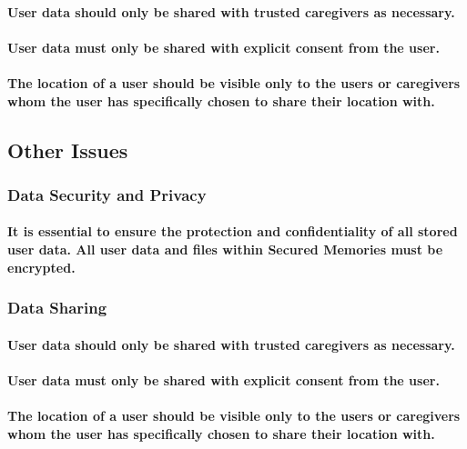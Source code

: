 \documentclass{article}
\begin{document}
\paragraph{User data should only be shared with trusted caregivers as necessary.}
\paragraph{User data must only be shared with explicit consent from the user.}
\paragraph{The location of a user should be visible only to the users or caregivers whom the user has specifically chosen to share their location with.}
\subsection{Other Issues}
\subsubsection*{Data Security and Privacy}
\paragraph{It is essential to ensure the protection and confidentiality of all stored user data. All user data and files within Secured Memories must be encrypted.}
\subsubsection*{Data Sharing}
\paragraph{User data should only be shared with trusted caregivers as necessary.}
\paragraph{User data must only be shared with explicit consent from the user.}
\paragraph{The location of a user should be visible only to the users or caregivers whom the user has specifically chosen to share their location with.}
\newpage
\end{document}
